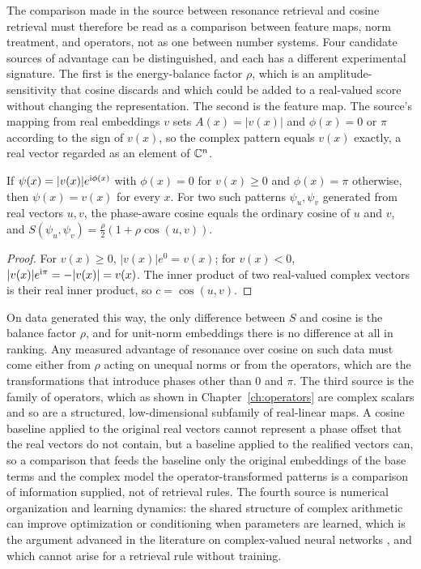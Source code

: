 The comparison made in the source between resonance retrieval and cosine retrieval must therefore be read as a comparison between feature maps, norm treatment, and operators, not as one between number systems. Four candidate sources of advantage can be distinguished, and each has a different experimental signature. The first is the energy-balance factor $\rho$, which is an amplitude-sensitivity that cosine discards and which could be added to a real-valued score without changing the representation. The second is the feature map. The source's mapping from real embeddings $v$ sets $A(x)=|v(x)|$ and $\phi(x)=0$ or $\pi$ according to the sign of $v(x)$, so the complex pattern equals $v(x)$ exactly, a real vector regarded as an element of $\mathbb{C}^n$.
\begin{proposition}\label{prop:signphase}
If $\psi(x)=|v(x)|e^{\mathrm{i}\phi(x)}$ with $\phi(x)=0$ for $v(x)\ge0$ and $\phi(x)=\pi$ otherwise, then $\psi(x)=v(x)$ for every $x$. For two such patterns $\psi_u,\psi_v$ generated from real vectors $u,v$, the phase-aware cosine equals the ordinary cosine of $u$ and $v$, and $S(\psi_u,\psi_v)=\frac\rho2(1+\rho\cos(u,v))$.
\end{proposition}
\begin{proof}
For $v(x)\ge0$, $|v(x)|e^{0}=v(x)$; for $v(x)<0$, $|v(x)|e^{\mathrm{i}\pi}=-|v(x)|=v(x)$. The inner product of two real-valued complex vectors is their real inner product, so $c=\cos(u,v)$.
\end{proof}
On data generated this way, the only difference between $S$ and cosine is the balance factor $\rho$, and for unit-norm embeddings there is no difference at all in ranking. Any measured advantage of resonance over cosine on such data must come either from $\rho$ acting on unequal norms or from the operators, which are the transformations that introduce phases other than $0$ and $\pi$. The third source is the family of operators, which as shown in Chapter~\ref{ch:operators} are complex scalars and so are a structured, low-dimensional subfamily of real-linear maps. A cosine baseline applied to the original real vectors cannot represent a phase offset that the real vectors do not contain, but a baseline applied to the realified vectors can, so a comparison that feeds the baseline only the original embeddings of the base terms and the complex model the operator-transformed patterns is a comparison of information supplied, not of retrieval rules. The fourth source is numerical organization and learning dynamics: the shared structure of complex arithmetic can improve optimization or conditioning when parameters are learned, which is the argument advanced in the literature on complex-valued neural networks \cite{trabelsi2018}, and which cannot arise for a retrieval rule without training.


